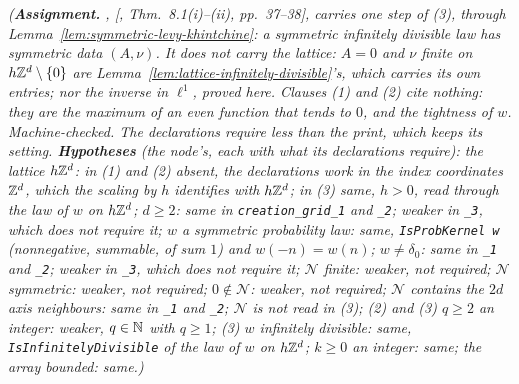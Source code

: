 \begin{proposition}[creation on a grid]
\statusA\quad{}\quad\emph{(\textbf{Assignment.} ,
[, Thm.~8.1(i)--(ii), pp.~37--38], carries one step of (3), through
Lemma~\ref{lem:symmetric-levy-khintchine}: a symmetric infinitely divisible law has symmetric data
$(A, \nu)$. It does not carry the lattice: $A = 0$ and $\nu$ finite on
$h\mathbb{Z}^d \setminus \{0\}$ are Lemma~\ref{lem:lattice-infinitely-divisible}'s, which carries its own
entries; nor the inverse in $\ell^1$, proved here. Clauses (1) and (2) cite
nothing: they are the maximum of an even function that tends to $0$, and the tightness of $w$.
Machine-checked. The declarations require less than the print, which keeps its setting.
\textbf{Hypotheses} (the node's, each with what its declarations require): the lattice $h\mathbb{Z}^d$: in
(1) and (2) absent, the declarations work in the index coordinates $\mathbb{Z}^d$, which the scaling by
$h$ identifies with $h\mathbb{Z}^d$; in (3) same, $h > 0$, read through the law of $w$ on $h\mathbb{Z}^d$;
$d \ge 2$: same in \texttt{creation\_grid\_1} and \texttt{\_2}; weaker in \texttt{\_3}, which does
not require it; $w$ a symmetric probability law: same, \texttt{IsProbKernel w} (nonnegative, summable,
of sum $1$) and $w(-n) = w(n)$; $w \ne \delta_0$: same in \texttt{\_1} and \texttt{\_2}; weaker in
\texttt{\_3}, which does not require it; $\mathcal{N}$ finite: weaker, not required; $\mathcal{N}$
symmetric: weaker, not required; $0 \notin \mathcal{N}$: weaker, not required; $\mathcal{N}$ contains
the $2d$ axis neighbours: same in \texttt{\_1} and \texttt{\_2}; $\mathcal{N}$ is not read in (3);
(2) and (3) $q \ge 2$ an integer: weaker, $q \in \mathbb{N}$ with $q \ge 1$; (3) $w$ infinitely
divisible: same, \texttt{IsInfinitelyDivisible} of the law of $w$ on $h\mathbb{Z}^d$; $k \ge 0$ an
integer: same; the array bounded: same.)}
\end{proposition}

